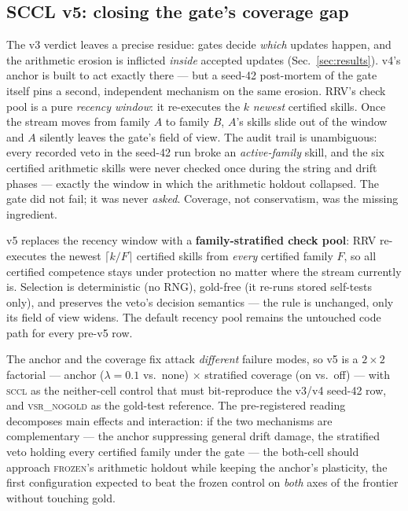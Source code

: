 \documentclass[10pt,conference]{IEEEtran}
\begin{document}
\subsection{SCCL v5: closing the gate's coverage gap}
\label{sec:v5}
The v3 verdict leaves a precise residue: gates decide \emph{which} updates happen, and the arithmetic erosion is inflicted \emph{inside} accepted updates (Sec.~\ref{sec:results}). v4's anchor is built to act exactly there --- but a seed-42 post-mortem of the gate itself pins a second, independent mechanism on the same erosion. RRV's check pool is a pure \emph{recency window}: it re-executes the $k$ \emph{newest} certified skills. Once the stream moves from family $A$ to family $B$, $A$'s skills slide out of the window and $A$ silently leaves the gate's field of view. The audit trail is unambiguous: every recorded veto in the seed-42 run broke an \emph{active-family} skill, and the six certified arithmetic skills were never checked once during the string and drift phases --- exactly the window in which the arithmetic holdout collapsed. The gate did not fail; it was never \emph{asked}. Coverage, not conservatism, was the missing ingredient.

v5 replaces the recency window with a \textbf{family-stratified check pool}: RRV re-executes the newest $\lceil k/F\rceil$ certified skills from \emph{every} certified family $F$, so all certified competence stays under protection no matter where the stream currently is. Selection is deterministic (no RNG), gold-free (it re-runs stored self-tests only), and preserves the veto's decision semantics --- the rule is unchanged, only its field of view widens. The default recency pool remains the untouched code path for every pre-v5 row.

The anchor and the coverage fix attack \emph{different} failure modes, so v5 is a $2\times2$ factorial --- anchor ($\lambda{=}0.1$ vs.\ none) $\times$ stratified coverage (on vs.\ off) --- with \textsc{sccl} as the neither-cell control that must bit-reproduce the v3/v4 seed-42 row, and \textsc{vsr\_nogold} as the gold-test reference. The pre-registered reading decomposes main effects and interaction: if the two mechanisms are complementary --- the anchor suppressing general drift damage, the stratified veto holding every certified family under the gate --- the both-cell should approach \textsc{frozen}'s arithmetic holdout while keeping the anchor's plasticity, the first configuration expected to beat the frozen control on \emph{both} axes of the frontier without touching gold.
\end{document}
